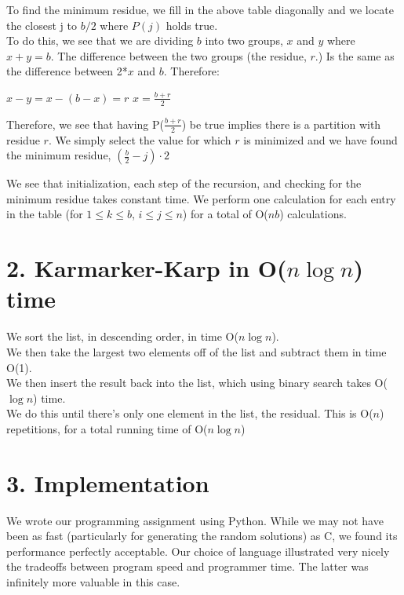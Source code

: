 \documentclass{article}
\begin{document}
To find the minimum residue, we fill in the above table diagonally and we locate the closest j to $b/2$ where $P(j)$ holds true.\\

To do this, we see that we are dividing $b$ into two groups, $x$ and $y$ where $x + y  = b$. The difference between the two groups (the residue, $r$.) Is the same as the difference between 2*$x$ and $b$. Therefore: 

\begin{center} 
$x - y = x - (b -x) = r$ 
$x = \frac{b + r}{2}$
\end{center}

Therefore, we see that having P($\frac{b + r}{2}$) be true implies there is a partition with residue $r$. We simply select the value for which $r$ is minimized and we have found the minimum residue, $(\frac{b}{2} - j)\cdot2$

We see that initialization, each step of the recursion, and checking for the minimum residue takes constant time. We perform one calculation for each entry in the table (for $1 \leq k \leq b$, $i \leq j \leq n$) for a total of O($nb$) calculations. 

\newpage
\section*{2. Karmarker-Karp in O($n\log{n}$) time} 
We sort the list, in descending order, in time O($n\log{n}$).\\ 

We then take the largest two elements off of the list and subtract them in time O(1).\\

We then insert the result back into the list, which using binary search takes O($\log{n}$) time. \\ 

We do this until there's only one element in the list, the residual. This is O($n$) repetitions, for a total running time of O($n\log{n}$)\\
    
\section*{3. Implementation} 
We wrote our programming assignment using Python. While we may not have been as fast (particularly for generating the random solutions) as C, we found its performance perfectly acceptable. Our choice of language illustrated very nicely the tradeoffs between program speed and programmer time. The latter was infinitely more valuable in this case.\\
\end{document}
